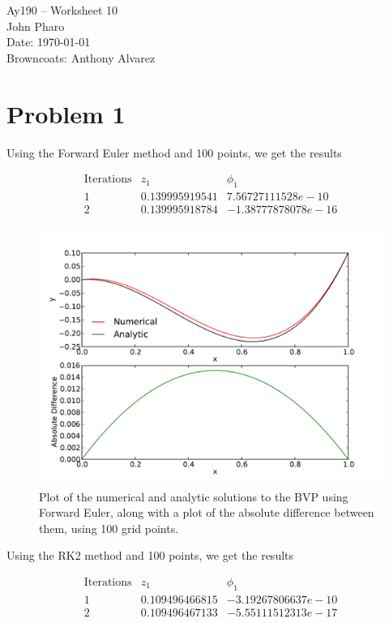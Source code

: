 \documentclass[11pt,letterpaper]{article}
\begin{document}
\begin{center}
\Large
Ay190 -- Worksheet 10\\
John Pharo\\
Date: \today\\
Browncoats: Anthony Alvarez
\end{center}

\section*{Problem 1}

Using the Forward Euler method and 100 points, we get the results

\[
\begin{array}{ccc}
\text{Iterations} & z_1 & \phi_1 \\
1 & 0.139995919541 & 7.56727111528e-10 \\
2 & 0.139995918784 & -1.38777878078e-16
\end{array}
\]

\begin{figure}[!htb]\centering
  \includegraphics[width=1\textwidth]{BVP}
  \caption{Plot of the numerical and analytic solutions to the BVP using Forward Euler, along with a plot of the absolute difference between them, using 100 grid points.}
  \end{figure}

Using the RK2 method and 100 points, we get the results

\[
\begin{array}{ccc}
\text{Iterations} & z_1 & \phi_1 \\
1 & 0.109496466815 & -3.19267806637e-10 \\
2 & 0.109496467133 & -5.55111512313e-17 
\end{array}
\]
\end{document}
